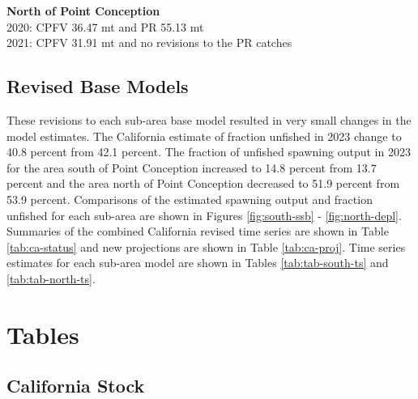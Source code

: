 \documentclass[
  letterpaper,
]{article}
\begin{document}
\textbf{North of Point Conception}\\
2020: CPFV 36.47 mt and PR 55.13 mt\\
2021: CPFV 31.91 mt and no revisions to the PR catches

\hypertarget{revised-base-models}{%
\subsection{Revised Base Models}\label{revised-base-models}}

These revisions to each sub-area base model resulted in very small changes in the model estimates. The California estimate of fraction unfished in 2023 change to 40.8 percent from 42.1 percent. The fraction of unfished spawning output in 2023 for the area south of Point Conception increased to 14.8 percent from 13.7 percent and the area north of Point Conception decreased to 51.9 percent from 53.9 percent. Comparisons of the estimated spawning output and fraction unfished for each sub-area are shown in Figures \ref{fig:south-ssb} - \ref{fig:north-depl}. Summaries of the combined California revised time series are shown in Table \ref{tab:ca-status} and new projections are shown in Table \ref{tab:ca-proj}. Time series estimates for each sub-area model are shown in Tables \ref{tab:tab-south-ts} and \ref{tab:tab-north-ts}.

\pagebreak

\hypertarget{tables}{%
\section{Tables}\label{tables}}

\hypertarget{california-stock}{%
\subsection{California Stock}\label{california-stock}}

\begingroup\fontsize{10}{12}\selectfont
\begingroup\fontsize{10}{12}\selectfont
\end{document}
